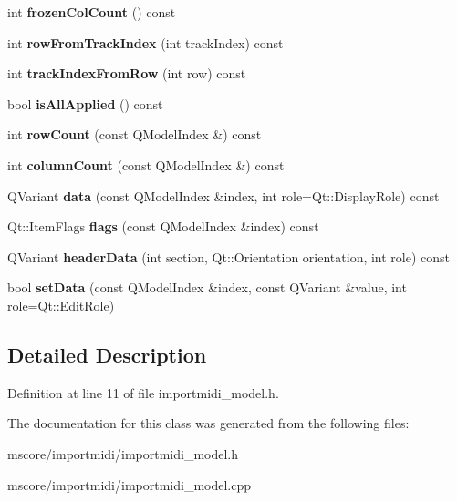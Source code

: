 \begin{DoxyCompactItemize}
int {\bfseries frozen\+Col\+Count} () const
\item 
\mbox{\label{class_ms_1_1_tracks_model_a59f33132f654a7d6607b1495740d4f01}} 
int {\bfseries row\+From\+Track\+Index} (int track\+Index) const
\item 
\mbox{\label{class_ms_1_1_tracks_model_a6de689b6e49a1d072c951d3dffb43951}} 
int {\bfseries track\+Index\+From\+Row} (int row) const
\item 
\mbox{\label{class_ms_1_1_tracks_model_ac2225e83de02b5bc18552324ba37afcd}} 
bool {\bfseries is\+All\+Applied} () const
\item 
\mbox{\label{class_ms_1_1_tracks_model_a7efe08dcccdc849e9e06746cbb6959bf}} 
int {\bfseries row\+Count} (const Q\+Model\+Index \&) const
\item 
\mbox{\label{class_ms_1_1_tracks_model_ab8462c310707ce4ad725efb78ac8815a}} 
int {\bfseries column\+Count} (const Q\+Model\+Index \&) const
\item 
\mbox{\label{class_ms_1_1_tracks_model_a11fd4a54cbe305e21b42d35317c7ce52}} 
Q\+Variant {\bfseries data} (const Q\+Model\+Index \&index, int role=Qt\+::\+Display\+Role) const
\item 
\mbox{\label{class_ms_1_1_tracks_model_ae41e34cc9d48966def641f1804f3dc75}} 
Qt\+::\+Item\+Flags {\bfseries flags} (const Q\+Model\+Index \&index) const
\item 
\mbox{\label{class_ms_1_1_tracks_model_ac2d40f2ca7fea60def29765a45d2c194}} 
Q\+Variant {\bfseries header\+Data} (int section, Qt\+::\+Orientation orientation, int role) const
\item 
\mbox{\label{class_ms_1_1_tracks_model_a9a2303c652e8169e12ec281fa162dba0}} 
bool {\bfseries set\+Data} (const Q\+Model\+Index \&index, const Q\+Variant \&value, int role=Qt\+::\+Edit\+Role)
\end{DoxyCompactItemize}


\subsection{Detailed Description}


Definition at line 11 of file importmidi\+\_\+model.\+h.



The documentation for this class was generated from the following files\+:\begin{DoxyCompactItemize}
\item 
mscore/importmidi/importmidi\+\_\+model.\+h\item 
mscore/importmidi/importmidi\+\_\+model.\+cpp\end{DoxyCompactItemize}
